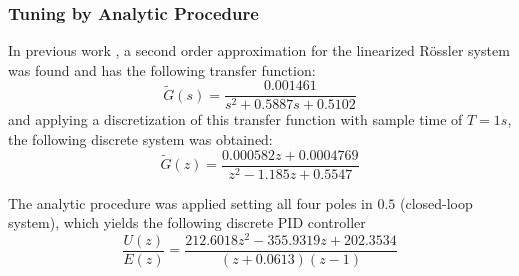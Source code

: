     \subsubsection{Tuning by Analytic Procedure}
    In previous work \cite{JS_PL2}, a second order approximation for the linearized Rössler system was found and has the following transfer function:
    \begin{equation}\label{eq:reduced_order2}
    \tilde{G}(s)=\dfrac{0.001461}{s^2 + 0.5887 s + 0.5102}
    \end{equation}
    and applying a discretization of this transfer function with sample time of $T=1s$, the following discrete system was obtained:
    \begin{equation}
    \tilde{G}(z) = \dfrac{0.000582z+0.0004769}{z^2-1.185z+0.5547}
    \end{equation}
    
    
    The analytic procedure was applied setting all four poles in $0.5$ (closed-loop system), which yields the following discrete PID controller
    \begin{equation}
    \dfrac{U(z)}{E(z)}=\dfrac{212.6018z^2-355.9319z+202.3534}{(z+0.0613)(z-1)}
    \end{equation}
    
